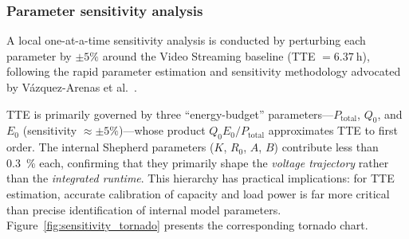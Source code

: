 \documentclass[5p,times,number]{elsarticle}
\newcommand{\figref}[1]{\hyperref[#1]{\textup{Figure~\ref*{#1}}}}
\def\figref#1{Figure~\ref{#1}}
\begin{document}
\subsubsection{Parameter sensitivity analysis}\label{sec:sensitivity}
A local one-at-a-time sensitivity analysis is conducted by perturbing each parameter by $\pm 5\%$ around the Video Streaming baseline (TTE $= \SI{6.37}{\hour}$), following the rapid parameter estimation and sensitivity methodology advocated by V\'{a}zquez-Arenas et al.~\cite{VazquezArenas2014ECM}.
\begin{table}[!tb]
\caption{Parameter sensitivity ($\pm 5\%$ perturbation, Video Streaming).}\label{tab:sensitivity}
\centering
{}
\end{table}
TTE is primarily governed by three ``energy-budget'' parameters---$P_{\mathrm{total}}$, $Q_0$, and $E_0$ (sensitivity $\approx \pm 5\%$)---whose product $Q_0 E_0 / P_{\mathrm{total}}$ approximates TTE to first order.
The internal Shepherd parameters ($K$, $R_0$, $A$, $B$) contribute less than \SI{0.3}{\percent} each, confirming that they primarily shape the \emph{voltage trajectory} rather than the \emph{integrated runtime}.
This hierarchy has practical implications: for TTE estimation, accurate calibration of capacity and load power is far more critical than precise identification of internal model parameters.
\figref{fig:sensitivity_tornado} presents the corresponding tornado chart.
\end{document}
